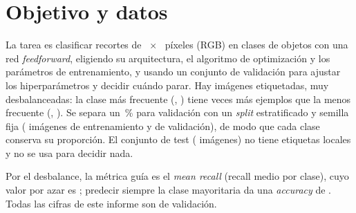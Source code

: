 \section{Objetivo y datos}
La tarea es clasificar recortes de ~$\times$~ píxeles (RGB) en 
clases de objetos con una red \emph{feedforward}, eligiendo su arquitectura, el algoritmo de optimización y los
parámetros de entrenamiento, y usando un conjunto de validación para ajustar los hiperparámetros y decidir cuándo
parar. Hay  imágenes etiquetadas, muy desbalanceadas: la clase más frecuente (,
) tiene  veces más ejemplos que la menos frecuente (,
). Se separa un \,\% para validación con un \emph{split} estratificado y
semilla fija ( imágenes de entrenamiento y  de validación), de modo que cada clase conserva
su proporción. El conjunto de test ( imágenes) no tiene etiquetas locales y no se usa para decidir nada.

Por el desbalance, la métrica guía es el \emph{mean recall} (recall medio por clase), cuyo valor por azar es
; predecir siempre la clase mayoritaria da una \emph{accuracy} de . Todas
las cifras de este informe son de validación.
